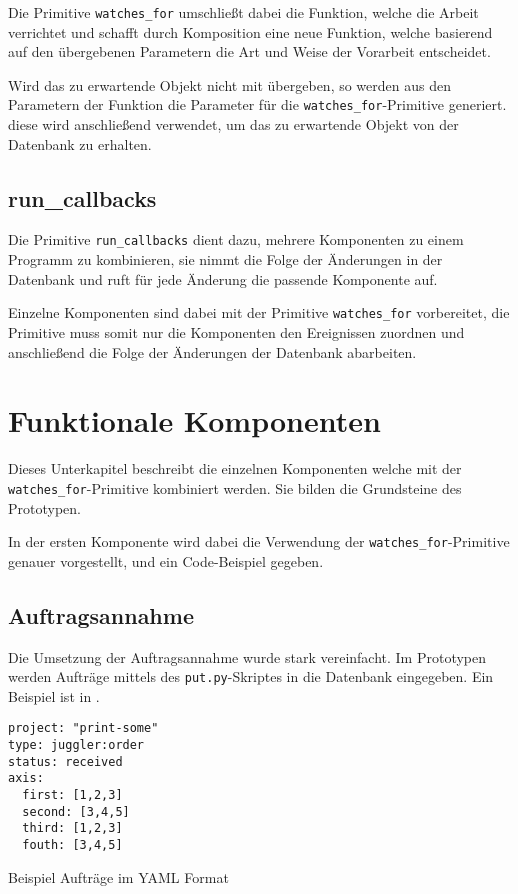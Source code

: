 Die Primitive \verb|watches_for| umschließt dabei die Funktion, welche die Arbeit verrichtet und schafft durch Komposition eine neue Funktion,
welche basierend auf den übergebenen Parametern die Art und Weise der Vorarbeit entscheidet.

Wird das zu erwartende Objekt nicht mit übergeben, so werden aus den Parametern der Funktion die Parameter für die \verb|watches_for|-Primitive generiert.
diese wird anschließend verwendet, um das zu erwartende Objekt von der Datenbank zu erhalten.



\subsection{run\_callbacks}

Die Primitive \verb|run_callbacks| dient dazu, mehrere Komponenten zu einem Programm
zu kombinieren, sie nimmt die Folge der Änderungen in der Datenbank und
ruft für jede Änderung die passende Komponente auf.

Einzelne Komponenten sind dabei mit der Primitive \verb|watches_for| vorbereitet,
die Primitive muss somit nur die Komponenten den Ereignissen zuordnen
und anschließend die Folge der Änderungen der Datenbank abarbeiten.

\section{Funktionale Komponenten}

Dieses Unterkapitel beschreibt die einzelnen Komponenten welche mit der \verb|watches_for|-Primitive kombiniert werden. Sie bilden die Grundsteine des Prototypen.

In der ersten Komponente wird dabei die Verwendung der \verb|watches_for|-Primitive genauer vorgestellt, und ein Code-Beispiel gegeben.

\subsection{Auftragsannahme}

Die Umsetzung der Auftragsannahme wurde stark vereinfacht.
Im Prototypen werden Aufträge mittels des \verb|put.py|-Skriptes in die Datenbank eingegeben.
Ein Beispiel ist in .
\begin{listing}[h]
\begin{verbatim}
project: "print-some"
type: juggler:order
status: received
axis:
  first: [1,2,3]
  second: [3,4,5]
  third: [1,2,3]
  fouth: [3,4,5]
\end{verbatim}
\caption{Beispiel Auftr\"age im YAML Format}
\label{fig:auftrag-beispieldaten}
\end{listing}

